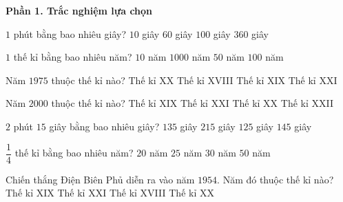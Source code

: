 \textbf{Phần 1. Trắc nghiệm lựa chọn}

\begin{ex} %
$1$ phút bằng bao nhiêu giây?
\choice
{$10$ giây}
{\True $60$ giây}
{$100$ giây}
{$360$ giây}
\end{ex}

\begin{ex} %
$1$ thế kỉ bằng bao nhiêu năm?
\choice
{$10$ năm}
{$1000$ năm}
{$50$ năm}
{\True $100$ năm}
\end{ex}

\begin{ex} %
Năm $1975$ thuộc thế kỉ nào?
\choice
{\True Thế kỉ XX}
{Thế kỉ XVIII}
{Thế kỉ XIX}
{Thế kỉ XXI}
\end{ex}

\begin{ex} %
Năm $2000$ thuộc thế kỉ nào?
\choice
{Thế kỉ XIX}
{Thế kỉ XXI}
{\True Thế kỉ XX}
{Thế kỉ XXII}
\end{ex}

\begin{ex} %
$2$ phút $15$ giây bằng bao nhiêu giây?
\choice
{\True $135$ giây}
{$215$ giây}
{$125$ giây}
{$145$ giây}
\end{ex}

\begin{ex} %
$\dfrac{1}{4}$ thế kỉ bằng bao nhiêu năm?
\choice
{$20$ năm}
{\True $25$ năm}
{$30$ năm}
{$50$ năm}
\end{ex}

\begin{ex} %
Chiến thắng Điện Biên Phủ diễn ra vào năm $1954$. Năm đó thuộc thế kỉ nào?
\choice
{Thế kỉ XIX}
{Thế kỉ XXI}
{Thế kỉ XVIII}
{\True Thế kỉ XX}
\end{ex}

